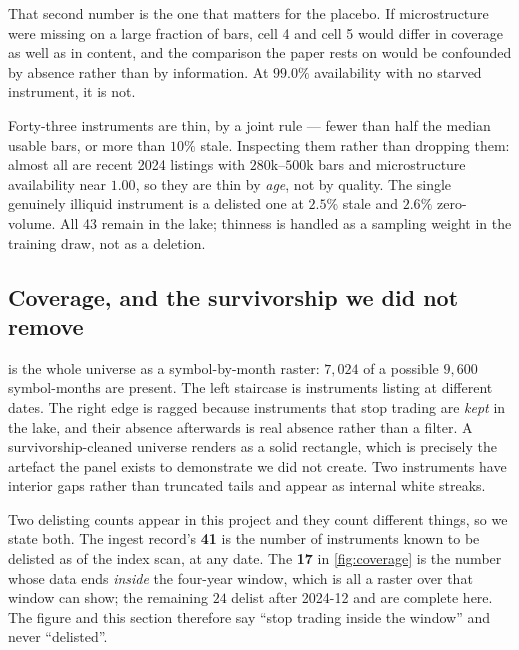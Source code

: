 That second number is the one that matters for the placebo. If microstructure were missing on a
large fraction of bars, cell 4 and cell 5 would differ in coverage as well as in content, and the
comparison the paper rests on would be confounded by absence rather than by information. At
$99.0\%$ availability with no starved instrument, it is not.

Forty-three instruments are thin, by a joint rule --- fewer than half the median usable bars, or
more than $10\%$ stale. Inspecting them rather than dropping them: almost all are recent 2024
listings with $280$k--$500$k bars and microstructure availability near $1.00$, so they are thin by
\emph{age}, not by quality. The single genuinely illiquid instrument is a delisted one at $2.5\%$
stale and $2.6\%$ zero-volume. All 43 remain in the lake; thinness is handled as a sampling weight
in the training draw, not as a deletion.

\subsection{Coverage, and the survivorship we did not remove}
\label{sec:data-coverage}

 is the whole universe as a symbol-by-month raster: $7{,}024$ of a possible
$9{,}600$ symbol-months are present. The left staircase is instruments listing at different dates.
The right edge is ragged because instruments that stop trading are \emph{kept} in the lake, and
their absence afterwards is real absence rather than a filter. A survivorship-cleaned universe
renders as a solid rectangle, which is precisely the artefact the panel exists to demonstrate we
did not create. Two instruments have interior gaps rather than truncated tails and appear as
internal white streaks.

Two delisting counts appear in this project and they count different things, so we state both. The
ingest record's \textbf{41} is the number of instruments known to be delisted as of the index scan,
at any date. The \textbf{17} in \cref{fig:coverage} is the number whose data ends \emph{inside} the
four-year window, which is all a raster over that window can show; the remaining $24$ delist after
2024-12 and are complete here. The figure and this section therefore say ``stop trading inside the
window'' and never ``delisted''.

